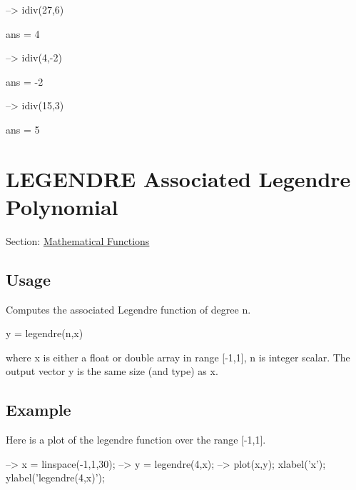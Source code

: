 \begin{DoxyVerbInclude}
--> idiv(27,6)

ans = 
 4 

--> idiv(4,-2)

ans = 
 -2 

--> idiv(15,3)

ans = 
 5 
\end{DoxyVerbInclude}
 \hypertarget{mathfunctions_legendre}{}\section{L\-E\-G\-E\-N\-D\-R\-E Associated Legendre Polynomial}\label{mathfunctions_legendre}
Section\-: \hyperlink{sec_mathfunctions}{Mathematical Functions} \hypertarget{vtkwidgets_vtkxyplotwidget_Usage}{}\subsection{Usage}\label{vtkwidgets_vtkxyplotwidget_Usage}
Computes the associated Legendre function of degree n. \begin{DoxyVerb}  y = legendre(n,x)
\end{DoxyVerb}
 where {\ttfamily x} is either a {\ttfamily float} or {\ttfamily double} array in range {\ttfamily \mbox{[}-\/1,1\mbox{]}}, {\ttfamily n} is integer scalar. The output vector {\ttfamily y} is the same size (and type) as {\ttfamily x}. \hypertarget{variables_struct_Example}{}\subsection{Example}\label{variables_struct_Example}
Here is a plot of the {\ttfamily legendre} function over the range {\ttfamily \mbox{[}-\/1,1\mbox{]}}.


\begin{DoxyVerbInclude}
--> x = linspace(-1,1,30);
--> y = legendre(4,x);
--> plot(x,y); xlabel('x'); ylabel('legendre(4,x)');
\end{DoxyVerbInclude}


